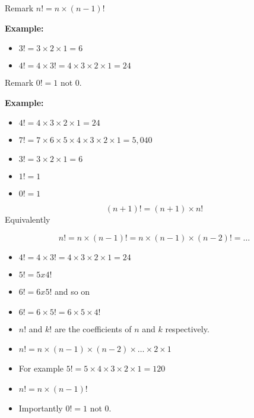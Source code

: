 \documentclass[]{report}
\begin{document}
Remark $n!  =n \times (n-1)!$\\ \bigskip

	
\noindent \textbf{ Example: }
	
	\begin{itemize}
		\item $3!  = 3 \times 2  \times 1 = 6 $
		
		\item $4!  = 4 \times 3! = 4 \times 3 \times 2 \times 1 = 24$
	\end{itemize}
	Remark $0! = 1$ not $0$.
	
\textbf{ Example: }

\begin{multicols}{2}
\begin{itemize}
\item $4! = 4 \times 3 \times 2 \times 1 = 24$
\item $7! = 7 \times 6 \times 5 \times 4 \times 3 \times 2 \times 1 = 5,040$
\item $3!  = 3 \times 2  \times 1 = 6 $
\item $1! = 1$
\item $0! = 1 $
\end{itemize}
\end{multicols}

\[ (n+1)! = (n+1) \times n! \] 
Equivalently

\[n! = n \times (n-1)!  = n \times (n-1) \times (n-2)! = \ldots \]

\begin{itemize}
\item $4!  = 4 \times 3! = 4 \times 3 \times 2 \times 1 = 24$
\item $5! = 5 x 4!$
\item $6! = 6 x 5!$  and so on
\item $6! = 6 \times 5!  = 6 \times 5 \times 4!$
\end{itemize}


\begin{itemize}
	\item  $n!$ and $k!$ are the coefficients of $n$ and $k$ respectively.
	\item  $n! = n \times (n-1) \times (n-2) \times \ldots \times 2 \times 1$
	\item  For example $5! = 5\times4\times3\times2\times1 = 120$
	\item  $n! = n \times (n-1)!$
	\item  Importantly $0! = 1$ not 0.
\end{itemize}
\end{document}
